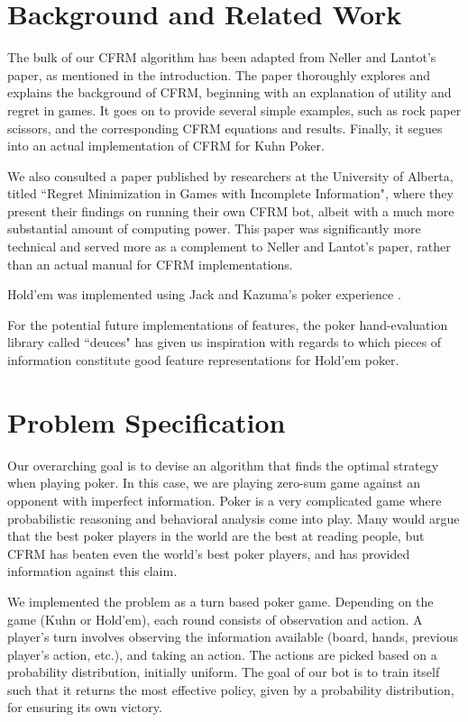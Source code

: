 \documentclass[11pt]{article}
\begin{document}
\section{Background and Related Work}
The bulk of our CFRM algorithm has been adapted from Neller and Lantot's paper\cite{introtocfrm}, as mentioned in the introduction. The paper thoroughly explores and explains the background of CFRM, beginning with an explanation of utility and regret in games. It goes on to provide several simple examples, such as rock paper scissors, and the corresponding CFRM equations and results. Finally, it segues into an actual implementation of CFRM for Kuhn Poker.

We also consulted a paper published by researchers at the University of Alberta, titled ``Regret Minimization in Games with Incomplete
Information", where they present their findings on running their own CFRM bot, albeit with a much more substantial amount of computing power\cite{regretmin}. This paper was significantly more technical and served more as a complement to Neller and Lantot's paper, rather than an actual manual for CFRM implementations.

Hold'em was implemented using Jack and Kazuma's poker experience \cite{twinrivers}.

For the potential future implementations of features, the poker hand-evaluation library called ``deuces" has given us inspiration with regards to which pieces of information constitute good feature representations for Hold'em poker.

\section{Problem Specification}

Our overarching goal is to devise an algorithm that finds the optimal strategy when playing poker. In this case, we are playing zero-sum game against an opponent with imperfect information. Poker is a very complicated game where probabilistic reasoning and behavioral analysis come into play. Many would argue that the best poker players in the world are the best at reading people, but CFRM has beaten even the world's best poker players, and has provided information against this claim.

We implemented the problem as a turn based poker game. Depending on the game (Kuhn or Hold'em), each round consists of observation and action. A player's turn involves observing the information available (board, hands, previous player's action, etc.), and taking an action. The actions are picked based on a probability distribution, initially uniform. The goal of our bot is to train itself such that it returns the most effective policy, given by a probability distribution, for ensuring its own victory.
\end{document}
